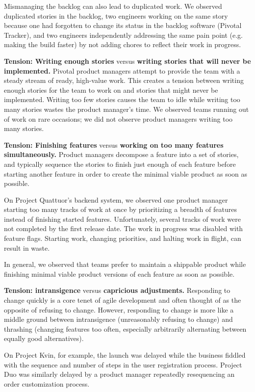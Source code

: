 Mismanaging the backlog can also lead to duplicated work. We observed duplicated stories in the backlog, two engineers working on the same story because one had forgotten to change its status in the backlog software (Pivotal Tracker), and two engineers independently addressing the same pain point (e.g. making the build faster) by not adding chores to reflect their work in progress.

\textbf{Tension: Writing enough stories} versus \textbf{writing stories that will never be implemented.}
Pivotal product managers attempt to provide the team with a steady stream of ready, high-value work. This creates a tension between writing enough stories for the team to work on and  stories that might never be implemented. Writing too few stories causes the team to idle while writing too many stories wastes the product manager's time. We observed teams running out of work on rare occasions; we did not observe product managers writing too many stories.  

\textbf{Tension: Finishing features} versus \textbf{working on too many features simultaneously.}
Product managers decompose a feature into a set of stories, and typically sequence the stories to finish just enough of each feature before starting another feature in order to create the minimal viable product as soon as possible. 

On Project Quattuor's backend system, we observed one product manager starting too many tracks of work at once by prioritizing a breadth of features instead of finishing started features. Unfortunately, several tracks of work were not completed by the first release date. The work in progress was disabled with feature flags. Starting work, changing priorities, and halting work in flight, can result in waste.

In general, we observed that teams prefer to maintain a shippable product while finishing minimal viable product versions of each feature as soon as possible.

\textbf{Tension: intransigence} versus \textbf{capricious adjustments.}
Responding to change quickly is a core tenet of agile development and often thought of as the opposite of refusing to change. However, responding to change is more like a middle ground between intransigence (unreasonably refusing to change) and thrashing (changing features too often, especially arbitrarily alternating between equally good alternatives). 

On Project Kvin, for example, the launch was delayed while the business fiddled with the sequence and number of steps in the user registration process. Project Duo was similarly delayed by a product manager repeatedly resequencing an order customization process. 

